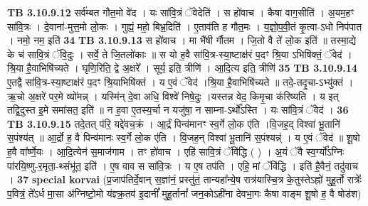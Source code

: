 \documentclass[17pt]{extarticle}
\begin{document}
{{{{{{{{{{{{{{{{{{{{{{                                \textbf{ TB 3.10.9.12} \newline
                  सर्व॑म्बत गौत॒मो वे॑द । यः सा॑वि॒त्रं ॅवेदेति॑ । स हो॑वाच । कैषा वाग॒सीति॑ । अ॒यम॒हꣳ सा॑वि॒त्रः । दे॒वाना॑-मुत्त॒मो लो॒कः । गुह्यं॒ महो॒ बिभ्र॒दिति॑ । ए॒ताव॑ति ह गौत॒मः । य॒ज्ञो॒प॒वी॒तं कृ॒त्वा-ऽधो निप॑पात । नमो॒ नम॒ इति॑ \textbf{ 34} \newline
                  \newline
                                \textbf{ TB 3.10.9.13} \newline
                  स हो॑वाच । मा भै॑षी र्गौतम । जि॒तो वै ते॑ लो॒क इति॑ ॥ तस्मा॒द्ये के च॑ सावि॒त्रं ॅवि॒दुः । सर्वे॒ ते जि॒तलो॑काः ॥ स यो ह॒वै सा॑वि॒त्र-स्या॒ष्टाक्ष॑रं प॒दꣳ श्रि॒या ऽभिषि॑क्तं॒ ॅवेद॑ । श्रि॒या है॒वाभिषि॑च्यते । घृणि॒रिति॒ द्वे अ॒क्षरे᳚ । सूर्य॒ इति॒ त्रीणि॑ । आ॒दि॒त्य इति॒ त्रीणि॑ \textbf{ 35} \newline
                  \newline
                                \textbf{ TB 3.10.9.14} \newline
                  ए॒तद्वै सा॑वि॒त्र-स्या॒ष्टाक्ष॑रं प॒दꣳ श्रि॒याभिषि॑क्तं । य ए॒वं ॅवेद॑ ।श्रि॒या है॒वाभिषि॑च्यते ॥ तदे॒-तदृ॒चा-ऽभ्यु॑क्तं । ऋ॒चो अ॒क्षरे॑ पर॒मे व्यो॑मन्न् । यस्मि॑न् दे॒वा अधि॒ विश्वे॑ निषे॒दुः ।यस्तन्न वेद॒ किमृ॒चा क॑रिष्यति । य इत् तद्वि॒दुस्त इ॒मे समा॑सत॒ इति॑ ॥ न ह॒वा ए॒तस्य॒र्चा न यजु॑षा॒ न साम्ना-ऽर्थो᳚ऽस्ति । यः सा॑वि॒त्रं ॅवेद॑ । \textbf{ 36} \newline
                  \newline
                                \textbf{ TB 3.10.9.15} \newline
                  तदे॒तत् प॑रि॒ यद्दे॑वच॒क्रं । आ॒र्द्रं पिन्व॑मानꣳ स्व॒र्गे लो॒क ए॑ति ।वि॒जह॒द् विश्वा॑ भू॒तानि॑ स॒पंश्य॑त् ॥ आ॒र्द्रो ह॒ वै पिन्व॑मानः स्व॒र्गे लो॒क ए॑ति । वि॒जह॒न् विश्वा॑ भू॒तानि॑ स॒पंश्यन्न्॑ । य ए॒वं ॅवेद॑ ॥ शू॒षो ह॒वै वा᳚र्ष्णे॒यः । आ॒दि॒त्येन॑ स॒माज॑गाम । तꣳ हो॑वाच । एहि॑ सावि॒त्रं ॅवि॑द्धि ( ) । अ॒यं ॅवै स्व॒र्ग्यो᳚ऽग्निः पा॑रयि॒ष्णु-र॒मृता॒-थ्संभू॑त॒ इति॑ । ए॒ष वाव स सा॑वि॒त्रः । य ए॒ष तप॑ति । एहि॒ मां ॅवि॑द्धि । इति॑ है॒वैनं॒ तदु॑वाच । \textbf{ 37} \newline
                  \newline
                                                        \textbf{special korvai} \newline
              (प्र॒जाप॑तिर्दे॒वान् स॒ज्ञांनं॒ प्रस्तु॑तं॒ तान्यहा᳚न्ये॒ष रात्र॑यास्चि॒त्र के॒तुस्तेऽह्नो॑ मुहू॒र्तो रात्रेः᳚ प॒वित्रं॒ ते᳚ऽर्ध मा॒सा अ॑ग्निष्टो॒मो य॑ज्ञ्क्र॒तव॑ इ॒दानीं᳚ मुहू॒र्तानां᳚ जन॒कोऽही॑ना देवभा॒गः कैषा वाङ्म शू॒षो ह॒ वै षोड॑श) \newline
}}}}}}}}}}}}}}}}}}}}}}
\end{document}
